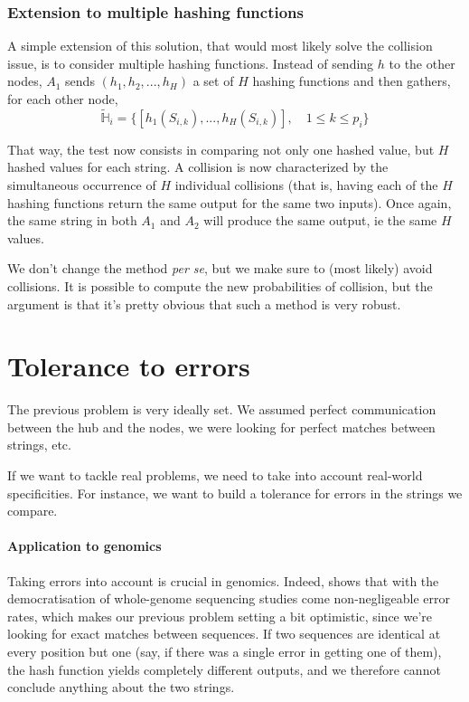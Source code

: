 \documentclass[usletter,11pt,final]{article}
\begin{document}
\subsubsection{Extension to multiple hashing functions}
A simple extension of this solution, that would most likely solve the collision issue, is to consider multiple hashing functions. Instead of sending $h$ to the other nodes, $A_1$ sends $(h_1, h_2, ..., h_H)$ a set of $H$ hashing functions and then gathers, for each other node, $$ \widetilde{\mathbb{H}}_i = \{[h_1(S_{i,k}), ..., h_H(S_{i,k})], \quad 1 \le k \le p_i\}$$

That way, the test now consists in comparing not only one hashed value, but $H$ hashed values for each string. A collision is now characterized by the simultaneous occurrence of $H$ individual collisions (that is, having each of the $H$ hashing functions return the same output for the same two inputs). Once again, the same string in both $A_1$ and $A_2$ will produce the same output, ie the same $H$ values.

We don't change the method \textit{per se}, but we make sure to (most likely) avoid collisions. It is possible to compute the new probabilities of collision, but the argument is that it's pretty obvious that such a method is very robust.

\section{Tolerance to errors}

The previous problem is very ideally set. We assumed perfect communication between the hub and the nodes, we were looking for perfect matches between strings, etc.

If we want to tackle real problems, we need to take into account real-world specificities. For instance, we want to build a tolerance for errors in the strings we compare.

\paragraph{Application to genomics} Taking errors into account is crucial in genomics. Indeed, \cite{wall2014estimating} shows that with the democratisation of whole-genome sequencing studies come non-negligeable error rates, which makes our previous problem setting a bit optimistic, since we're looking for exact matches between sequences. If two sequences are identical at every position but one (say, if there was a single error in getting one of them), the hash function yields completely different outputs, and we therefore cannot conclude anything about the two strings.
\end{document}
